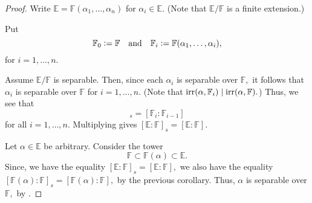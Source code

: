 \sepiffdegequal*\label{thm:sepiffdegequal2}
\begin{flushright}\hyperref[thm:sepiffdegequal]{\upsym}\end{flushright}
\begin{proof}
     Write $\mathbb{E} = \mathbb{F}(\alpha_1, \ldots, \alpha_n)$ for $\alpha_i \in \mathbb{E}.$ (Note that $\mathbb{E}/\mathbb{F}$ is a finite extension.)

    Put 
    \begin{equation*} 
        \mathbb{F}_0 \vcentcolon= \mathbb{F} \quad\text{and}\quad \mathbb{F}_i \vcentcolon= \mathbb{F}(\alpha_1, \ldots, \alpha_i),
    \end{equation*} 
    for $i = 1, \ldots, n.$

    \forward Assume $\mathbb{E}/\mathbb{F}$ is separable. Then, since each $\alpha_i$ is separable over $\mathbb{F},$ it follows that $\alpha_i$ is separable over $\mathbb{F}$ for $i = 1, \ldots, n.$ (Note that $\operatorname{irr}(\alpha, \mathbb{F}_i) \mid \operatorname{irr}(\alpha, \mathbb{F}).$) Thus, we see that 
    \begin{equation*} 
        [\mathbb{F}_{i} : \mathbb{F}_{i - 1}]_s = [\mathbb{F}_{i} : \mathbb{F}_{i - 1}]
    \end{equation*}
    for all $i = 1, \ldots, n.$ Multiplying gives $[\mathbb{E} : \mathbb{F}]_s = [\mathbb{E}:\mathbb{F}].$

    \backward Let $\alpha \in \mathbb{E}$ be arbitrary. Consider the tower
    \begin{equation*} 
        \mathbb{F} \subset \mathbb{F}(\alpha) \subset \mathbb{E}.
    \end{equation*}
    Since, we have the equality $[\mathbb{E} : \mathbb{F}]_s = [\mathbb{E} : \mathbb{F}],$ we also have the equality $[\mathbb{F}(\alpha) : \mathbb{F}]_s = [\mathbb{F}(\alpha) : \mathbb{F}],$ by the previous corollary. Thus, $\alpha$ is separable over $\mathbb{F},$ by .
\end{proof}

